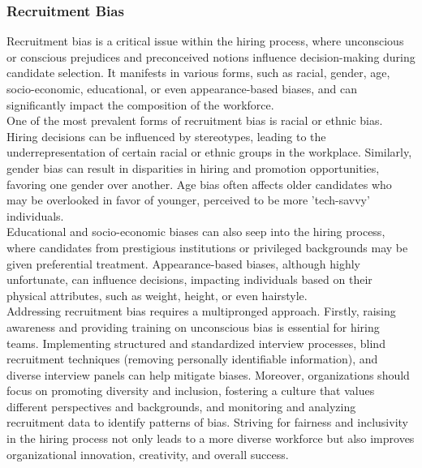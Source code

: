 \documentclass[12pt,a4paper,openright,twoside]{book}
\begin{document}
\subsubsection{Recruitment Bias}
Recruitment bias is a critical issue within the hiring process, where unconscious or conscious prejudices and preconceived notions influence decision-making during candidate selection. It manifests in various forms, such as racial, gender, age, socio-economic, educational, or even appearance-based biases, and can significantly impact the composition of the workforce. \cite{mujtaba2019ethical} \\
One of the most prevalent forms of recruitment bias is racial or ethnic bias. Hiring decisions can be influenced by stereotypes, leading to the underrepresentation of certain racial or ethnic groups in the workplace. Similarly, gender bias can result in disparities in hiring and promotion opportunities, favoring one gender over another. Age bias often affects older candidates who may be overlooked in favor of younger, perceived to be more 'tech-savvy' individuals. \\
Educational and socio-economic biases can also seep into the hiring process, where candidates from prestigious institutions or privileged backgrounds may be given preferential treatment. Appearance-based biases, although highly unfortunate, can influence decisions, impacting individuals based on their physical attributes, such as weight, height, or even hairstyle. \\
Addressing recruitment bias requires a multipronged approach. Firstly, raising awareness and providing training on unconscious bias is essential for hiring teams. Implementing structured and standardized interview processes, blind recruitment techniques (removing personally identifiable information), and diverse interview panels can help mitigate biases. Moreover, organizations should focus on promoting diversity and inclusion, fostering a culture that values different perspectives and backgrounds, and monitoring and analyzing recruitment data to identify patterns of bias. Striving for fairness and inclusivity in the hiring process not only leads to a more diverse workforce but also improves organizational innovation, creativity, and overall success.
\end{document}
